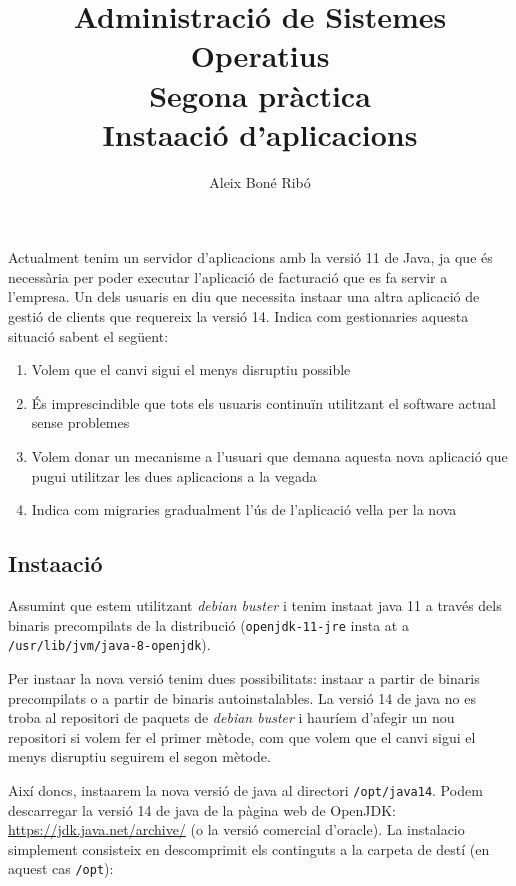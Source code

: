 \documentclass[12pt, oneside]{article}
\title{
    \bfseries
    Administració de Sistemes Operatius \\
    \Large
Segona pràctica \\
\large
Insta\lgem ació d'aplicacions
}
\author{
Aleix Boné Ribó
}
\begin{document}
\maketitle

\hrulefill

\vspace{2em}

Actualment tenim un servidor d'aplicacions amb la versió 11 de Java, ja que és
necessària per poder executar l'aplicació de facturació que es fa servir a
l'empresa. Un dels usuaris en diu que necessita insta\lgem ar una altra aplicació
de gestió de clients que requereix la versió 14. Indica com gestionaries aquesta
situació sabent el següent:

\begin{enumerate}
    \item Volem que el canvi sigui el menys disruptiu possible

    \item És imprescindible que tots els usuaris continuïn utilitzant el software actual sense problemes

    \item Volem donar un mecanisme a l'usuari que demana aquesta nova aplicació que pugui utilitzar les dues aplicacions a la vegada

    \item Indica com migraries gradualment l'ús de l'aplicació vella per la nova
\end{enumerate}

\hrulefill

\pagebreak

\subsection*{Insta\lgem ació}

Assumint que estem utilitzant \emph{debian buster} i tenim insta\lgem at java 11 a través
dels binaris precompilats de la distribució (\texttt{openjdk-11-jre} insta\lgem
at a \texttt{/usr/lib/jvm/java-8-openjdk}).

Per insta\lgem ar la nova versió tenim dues possibilitats: insta\lgem ar a partir de
binaris precompilats o a partir de binaris autoinstalables. La versió 14 de java
no es troba al repositori de paquets de \emph{debian buster} i hauríem d'afegir un nou
repositori si volem fer el primer mètode, com que volem que el canvi sigui el
menys disruptiu seguirem el segon mètode.

Així doncs, insta\lgem arem la nova versió de java al directori
\texttt{/opt/java14}. Podem descarregar la versió 14 de java de la pàgina web de
OpenJDK: \url{https://jdk.java.net/archive/} (o la versió comercial d'oracle).
La instalacio simplement consisteix en descomprimit els continguts a la carpeta
de destí (en aquest cas \texttt{/opt}):
\end{document}
